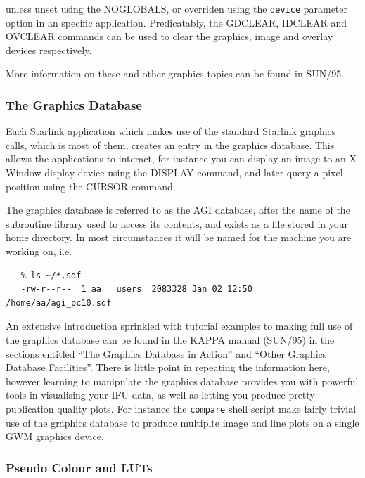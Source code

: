 \documentclass[twoside,11pt]{article}
\newcommand{\xref}[3]{#1}
\begin{document}
unless unset using the \xref{NOGLOBALS}{sun95}{NOGLOBALS}, or overriden using the {\tt device} parameter option in an specific application. Predicatably, the \xref{GDCLEAR}{sun95}{GDCLEAR}, \xref{IDCLEAR}{sun95}{IDCLEAR} and \xref{OVCLEAR}{sun95}{OVCLEAR} commands can be used to clear the graphics, image and overlay devices respectively.

More information on these and other graphics topics can be found in \xref{SUN/95}{sun95}{}.

\subsubsection{The Graphics Database}

Each Starlink application which makes use of the standard Starlink graphics calls, which is most of them, creates an entry in the graphics database. This allows the applications to interact, for instance you can display an image to an X Window display device using the DISPLAY command, and later query a pixel position using the CURSOR command.

The graphics database is referred to as the AGI database, after the name of the \xref{subroutine library}{sun48}{} used to access its contents, and exists as a file stored in your home directory. In most circumstances it will be named for the machine you are working on, i.e.

\small\begin{verbatim}
   % ls ~/*.sdf
   -rw-r--r--  1 aa   users  2083328 Jan 02 12:50  /home/aa/agi_pc10.sdf
\end{verbatim}\normalsize

An extensive introduction sprinkled with tutorial examples to making full use of the \xref{graphics database}{sun95}{se_agitate} can be found in the KAPPA manual (SUN/95) in the sections entitled \xref{``The Graphics Database in Action''}{sun95}{se_agiaction} and \xref{``Other Graphics Database Facilities''}{sun95}{se_agiother}. There is little point in repeating the information here, however learning to manipulate the graphics database provides you with powerful tools in visualising your IFU data, as well as letting you produce pretty publication quality plots. For instance the \xref{{\tt compare}}{sun237}{compare} shell script make fairly trivial use of the graphics database to produce multiplte image and line plots on a single GWM graphics device. 

\subsubsection{Pseudo Colour and LUTs}
\end{document}
